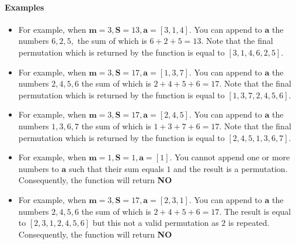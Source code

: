 \documentclass[a4paper]{exam}
\begin{document}
\begin{questions}
    \paragraph{Examples}
    \begin{itemize}
        \item For example, when $\mathbf{m}=3 ,\mathbf{S}=13,\mathbf{a}=[3,1,4]$. You can append to $\mathbf{a}$ the numbers $6,2,5,$ the sum of which is $6+2+5=13$. Note that the final permutation which is returned by the function is equal to $[3,1,4,6,2,5]$.
        \item For example, when $\mathbf{m}=3 ,\mathbf{S}=17,\mathbf{a}=[1,3,7]$. You can append to $\mathbf{a}$ the numbers $2,4,5,6$ the sum of which is $2+4+5+6=17$. Note that the final permutation which is returned by the function is equal to $[1,3,7,2,4,5,6]$.
        \item For example, when $\mathbf{m}=3 ,\mathbf{S}=17,\mathbf{a}=[2,4,5]$. You can append to $\mathbf{a}$ the numbers $1,3,6,7$ the sum of which is $1+3+7+6=17$. Note that the final permutation which is returned by the function is equal to $[2,4,5,1,3,6,7]$.
        \item For example, when $\mathbf{m}=1 ,\mathbf{S}=1,\mathbf{a}=[1]$. You cannot append one or more numbers to $\mathbf{a}$ such that their sum equals $1$ and the result is a permutation. Consequently, the function will return \textbf{NO}
        \item For example, when $\mathbf{m}=3 ,\mathbf{S}=17,\mathbf{a}=[2,3,1]$. You can append to $\mathbf{a}$ the numbers $2,4,5,6$ the sum of which is $2+4+5+6=17$. The result is equal to $[2,3,1,2,4,5,6]$ but this not a valid permutation as $2$ is repeated. Consequently, the function will return \textbf{NO}
        
    \end{itemize}
   

\end{questions}
\end{document}
